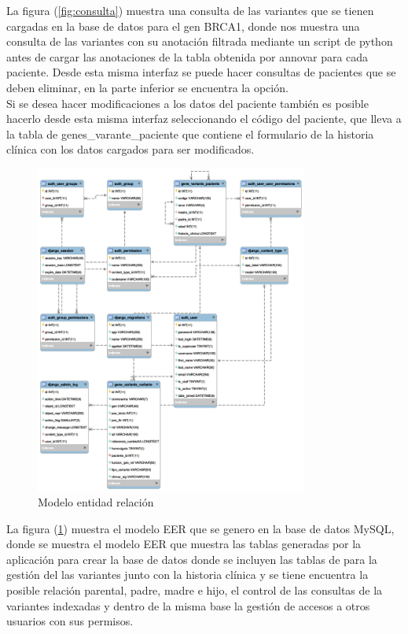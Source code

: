 La figura (\ref{fig:consulta}) muestra una consulta de las variantes que se tienen cargadas en la base de datos para el gen BRCA1, donde nos muestra una consulta de las variantes con su anotación  filtrada mediante un script de python antes de cargar las anotaciones de la tabla obtenida por annovar para cada paciente. Desde esta misma interfaz se puede hacer consultas de pacientes que se deben eliminar, en la parte inferior se encuentra la opción.\\

Si se desea hacer modificaciones a los datos del paciente también es posible hacerlo desde esta misma interfaz seleccionando el código del paciente, que lleva a la tabla de genes\_varante\_paciente que contiene el formulario de la historia clínica con los datos cargados para ser modificados. 

\begin{figure}[h]
	\centering
	\includegraphics[width=0.8\textwidth]{Kap3/modeloEER}
	\caption{Modelo entidad relación} \label{fig:t}
\end{figure}

La figura (\ref{fig:t}) muestra el modelo EER que se genero en la base de datos MySQL, donde se muestra el modelo  EER que muestra las tablas generadas por la aplicación para crear la base de datos donde se incluyen las tablas de para la gestión del las variantes junto con la historia clínica y se tiene encuentra la posible relación parental, padre, madre e hijo, el control de las consultas de la variantes indexadas y dentro de la misma base la gestión de accesos a otros usuarios con sus permisos.

